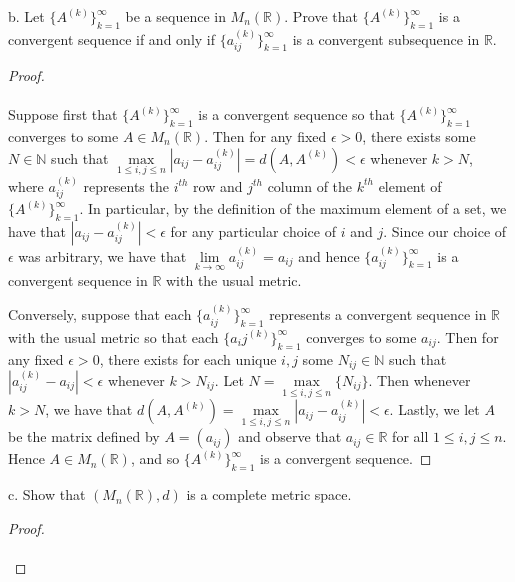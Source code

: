     \pagebreak

b.  Let $\{A^{(k)}\}_{k=1}^{\infty}$ be a sequence in $M_n(\mathbb{R})$. Prove that $\{A^{(k)}\}_{k=1}^{\infty}$ is a
    convergent sequence if and only if $\{a_{ij}^{(k)}\}_{k=1}^{\infty}$ is a convergent subsequence in $\mathbb{R}$.\ \\

    \begin{proof}\renewcommand{\qedsymbol}{}\ \\\\
        Suppose first that $\{A^{(k)}\}_{k=1}^{\infty}$ is a convergent sequence so that $\{A^{(k)}\}_{k=1}^{\infty}$ 
        converges to some $A \in M_n(\mathbb{R})$. Then for any fixed $\epsilon > 0$, there exists some 
        $N \in \mathbb{N}$ such that $\max\limits_{1 \le i,j \le n}{|a_{ij} - a^{(k)}_{ij}|} = d(A, A^{(k)}) < \epsilon$
        whenever $k > N$, where $a_{ij}^{(k)}$ represents the $i^{th}$ row and $j^{th}$ column of the $k^{th}$ element 
        of $\{A^{(k)}\}_{k=1}^{\infty}$. In particular, by the definition of the maximum element of a set, we have that 
        $|a_{ij} - a_{ij}^{(k)}| < \epsilon$ for any particular choice of $i$ and $j$. Since our choice of $\epsilon$ 
        was arbitrary, we have that $\lim\limits_{k \to \infty}{a_{ij}^{(k)} = a_{ij}}$ and hence 
        $\{a_{ij}^{(k)}\}_{k=1}^{\infty}$ is a convergent sequence in $\mathbb{R}$ with the usual metric.
        
        Conversely, suppose that each $\{a_{ij}^{(k)}\}_{k=1}^{\infty}$ represents a convergent sequence in $\mathbb{R}$
        with the usual metric so that each $\{a_ij^{(k)}\}_{k=1}^{\infty}$ converges to some $a_{ij}$. Then for any 
        fixed $\epsilon > 0$, there exists for each unique $i, j$ some $N_{ij} \in \mathbb{N}$ such that 
        $|a_{ij}^{(k)} - a_{ij}| < \epsilon$ whenever $k > N_{ij}$. Let $N = \max\limits_{1 \le i,j \le n}{\{N_{ij}\}}$.
        Then whenever $k > N$, we have that 
        $d(A, A^{(k)}) = \max\limits_{1 \le i,j \le n}{|a_{ij} - a^{(k)}_{ij}|} < \epsilon$. Lastly, we let 
        $A$ be the matrix defined by $A = \left(a_{ij}\right)$ and observe that $a_{ij} \in \mathbb{R}$ for all
        $1 \le i,j \le n$. Hence $A \in M_n(\mathbb{R})$, and so $\{A^{(k)}\}_{k=1}^{\infty}$ is a convergent sequence.
    \end{proof}

    \pagebreak

c.  Show that $\left(M_n(\mathbb{R}), d\right)$ is a complete metric space.

    \begin{proof}\renewcommand{\qedsymbol}{}\ \\\\
    \end{proof}

    \pagebreak